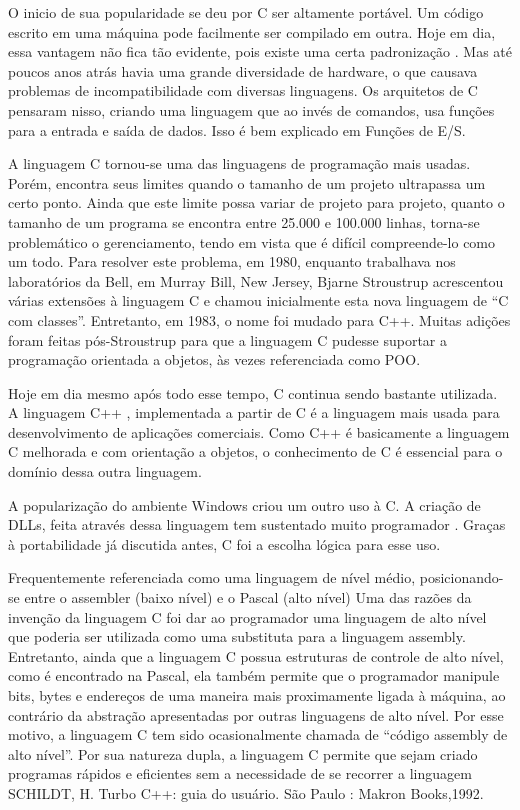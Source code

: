\documentclass[
    12pt,               %
    openright,          %
    twoside,            %
    a4paper,            %
    brazil              %
    ]{abntex2}
\begin{document}
O inicio de sua popularidade se deu por C ser altamente portável. Um código escrito em uma 
máquina pode facilmente ser compilado em outra. Hoje em dia, essa vantagem não fica tão 
evidente, pois existe uma certa padronização . Mas até poucos anos atrás havia uma grande 
diversidade de hardware, o que causava problemas de incompatibilidade com diversas linguagens. 
Os arquitetos de C pensaram nisso, criando uma linguagem que ao invés de comandos, usa funções 
para a entrada e saída de dados. Isso é bem explicado em Funções de E/S.

A linguagem C tornou-se uma das linguagens de programação mais usadas. Porém, encontra seus 
limites quando o tamanho de um projeto ultrapassa um certo ponto. Ainda que este limite possa 
variar de projeto para projeto, quanto o tamanho de um programa se encontra entre 25.000 e 100.000 
linhas, torna-se problemático o gerenciamento, tendo em vista que é difícil compreende-lo como 
um todo. Para resolver este problema, em 1980, enquanto trabalhava nos laboratórios da Bell, 
em Murray Bill, New Jersey, Bjarne Stroustrup acrescentou várias extensões à linguagem C e chamou 
inicialmente esta nova linguagem de “C com classes”. Entretanto, em 1983, o nome foi mudado para C++. 
Muitas adições foram feitas pós-Stroustrup para que a linguagem C pudesse suportar a programação 
orientada a objetos, às vezes referenciada como POO.

Hoje em dia mesmo após todo esse tempo, C continua sendo bastante utilizada. A linguagem C++ , 
implementada a partir de C é a linguagem mais usada para desenvolvimento de aplicações comerciais. 
Como C++ é basicamente a linguagem C melhorada e com orientação a objetos, o conhecimento de C é 
essencial para o domínio dessa outra linguagem.

A popularização do ambiente Windows criou um outro uso à C. A criação de DLLs, feita através dessa 
linguagem tem sustentado muito programador . Graças à portabilidade já discutida antes, C foi a 
escolha lógica para esse uso.

Frequentemente referenciada como uma linguagem de nível médio, posicionando-se entre o assembler 
(baixo nível) e o Pascal (alto nível) Uma das razões da invenção da linguagem C foi dar ao programador 
uma linguagem de alto nível que poderia ser utilizada como uma substituta para a linguagem assembly. 
Entretanto, ainda que a linguagem C possua estruturas de controle de alto nível, como é encontrado na 
Pascal, ela também permite que o programador manipule bits, bytes e endereços de uma maneira mais 
proximamente ligada à máquina, ao contrário da abstração apresentadas por outras linguagens de alto 
nível. Por esse motivo, a linguagem C tem sido ocasionalmente chamada de “código assembly de alto 
nível”. Por sua natureza dupla, a linguagem C permite que sejam criado programas rápidos e eficientes 
sem a necessidade de se recorrer a linguagem SCHILDT, H. Turbo C++: guia do usuário. São Paulo : 
Makron Books,1992.
\end{document}
